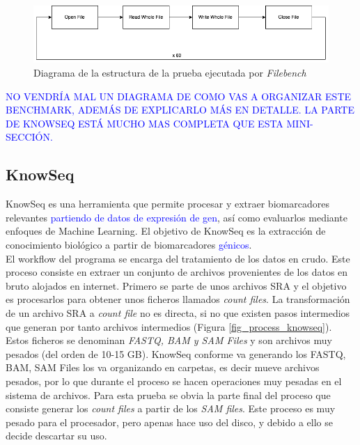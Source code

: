  \begin{figure}[H]
     \centering
     \includegraphics[scale=0.8]{doc/assets/images/Capitulo3/diageram_filebench.png}
     \caption{Diagrama de la estructura de la prueba ejecutada por \textit{Filebench}}
     \label{fig:my_label}
 \end{figure}



\textcolor{blue}{NO VENDRÍA MAL UN DIAGRAMA DE COMO VAS A ORGANIZAR ESTE BENCHMARK, ADEMÁS DE EXPLICARLO MÁS EN DETALLE. LA PARTE DE KNOWSEQ ESTÁ MUCHO MAS COMPLETA QUE ESTA MINI-SECCIÓN.}

\subsection{KnowSeq}\label{metodologia_knowseq}
KnowSeq es una herramienta que permite procesar y extraer biomarcadores relevantes \textcolor{blue}{partiendo de datos de expresión de gen}, así como evaluarlos mediante enfoques de Machine Learning. El objetivo de KnowSeq es la extracción de conocimiento biológico a partir de biomarcadores \textcolor{blue}{génicos}. \\

El workflow del programa se encarga del tratamiento de los datos en crudo. Este proceso consiste en extraer un conjunto de archivos provenientes de los datos en bruto alojados en internet. Primero se parte de unos archivos SRA y el objetivo es procesarlos para obtener unos ficheros llamados \textit{count files}. La transformación de un archivo SRA a \textit{count file} no es directa, si no que existen pasos intermedios que generan por tanto archivos intermedios (Figura \ref{fig_process_knowseq}). Estos ficheros se denominan \textit{FASTQ, BAM y SAM Files} y son archivos muy pesados (del orden de 10-15 GB). KnowSeq conforme va generando los FASTQ, BAM, SAM Files los va organizando en carpetas, es decir mueve archivos pesados, por lo que durante el proceso se hacen operaciones muy pesadas en el sistema de archivos. Para esta prueba se obvia la parte final del proceso que consiste generar los \textit{count files} a partir de los \textit{SAM files}. Este proceso es muy pesado para el procesador, pero apenas hace uso del disco, y debido a ello se decide descartar su uso.\\

